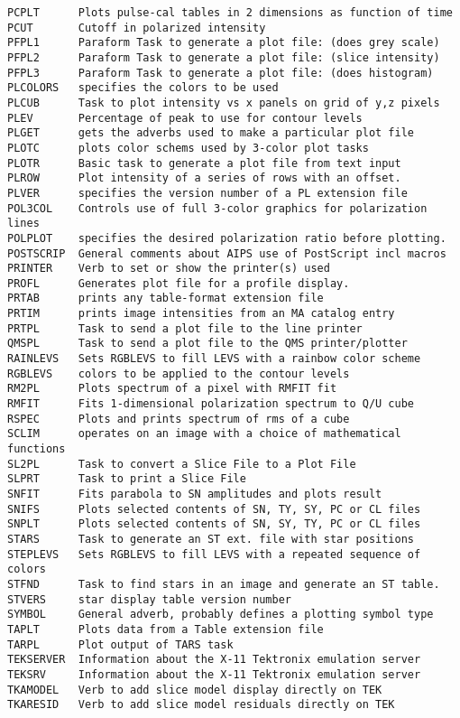 \begin{verbatim}
PCPLT      Plots pulse-cal tables in 2 dimensions as function of time
PCUT       Cutoff in polarized intensity
PFPL1      Paraform Task to generate a plot file: (does grey scale)
PFPL2      Paraform Task to generate a plot file: (slice intensity)
PFPL3      Paraform Task to generate a plot file: (does histogram)
PLCOLORS   specifies the colors to be used
PLCUB      Task to plot intensity vs x panels on grid of y,z pixels
PLEV       Percentage of peak to use for contour levels
PLGET      gets the adverbs used to make a particular plot file
PLOTC      plots color schems used by 3-color plot tasks
PLOTR      Basic task to generate a plot file from text input
PLROW      Plot intensity of a series of rows with an offset.
PLVER      specifies the version number of a PL extension file
POL3COL    Controls use of full 3-color graphics for polarization lines
POLPLOT    specifies the desired polarization ratio before plotting.
POSTSCRIP  General comments about AIPS use of PostScript incl macros
PRINTER    Verb to set or show the printer(s) used
PROFL      Generates plot file for a profile display.
PRTAB      prints any table-format extension file
PRTIM      prints image intensities from an MA catalog entry
PRTPL      Task to send a plot file to the line printer
QMSPL      Task to send a plot file to the QMS printer/plotter
RAINLEVS   Sets RGBLEVS to fill LEVS with a rainbow color scheme
RGBLEVS    colors to be applied to the contour levels
RM2PL      Plots spectrum of a pixel with RMFIT fit
RMFIT      Fits 1-dimensional polarization spectrum to Q/U cube
RSPEC      Plots and prints spectrum of rms of a cube
SCLIM      operates on an image with a choice of mathematical functions
SL2PL      Task to convert a Slice File to a Plot File
SLPRT      Task to print a Slice File
SNFIT      Fits parabola to SN amplitudes and plots result
SNIFS      Plots selected contents of SN, TY, SY, PC or CL files
SNPLT      Plots selected contents of SN, SY, TY, PC or CL files
STARS      Task to generate an ST ext. file with star positions
STEPLEVS   Sets RGBLEVS to fill LEVS with a repeated sequence of colors
STFND      Task to find stars in an image and generate an ST table.
STVERS     star display table version number
SYMBOL     General adverb, probably defines a plotting symbol type
TAPLT      Plots data from a Table extension file
TARPL      Plot output of TARS task
TEKSERVER  Information about the X-11 Tektronix emulation server
TEKSRV     Information about the X-11 Tektronix emulation server
TKAMODEL   Verb to add slice model display directly on TEK
TKARESID   Verb to add slice model residuals directly on TEK

\end{verbatim}
